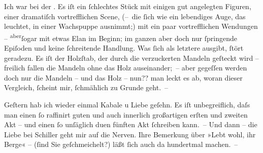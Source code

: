 \pstart
           Ich war bei der \label{K_L00392-2v}\label{K_L00392-2}. Es iſt ein{ }ſchlechtes Stück mit einigen gut
               angelegten Figuren, einer dramatiſch {\pb}vortrefflichen
               Scene, (– die \introOben{}ſich\introOben{} wie ein lebendiges Auge, das leuchtet,
                   in einer Wachspuppe ausnimmt;) mit ein
               paar vortrefflichen Wendungen – \substVorne{}\textsuperscript{aber}\substDazwischen{}ſogar\substHinten{} mit etwas Elan im Beginn; im ganzen aber doch nur{ }ſpringende Epiſoden und
               keine{ }ſchreitende Handlung. Was{ }ſich als letztere ausgibt,{ }ſtört geradezu. Es iſt der
               Holzſtab, der durch die verzuckerten Mandeln geſteckt wird – freilich fallen die
               Mandeln ohne das Holz auseinander; – aber gegeſſen werden doch nur die Mandeln – und
               das Holz – nun?? man leckt es ab, woran dieser Vergleich,{ }ſcheint mir, {\pb}ſchmählich zu Grunde geht. –\pend
           
\pstart
           Geſtern hab ich wieder einmal Kabale u Liebe
               geſehn. Es iſt unbegreiflich, daſs man einen{ }ſo raffinirt guten und auch innerlich
               großartigen erſten und zweiten Akt – und einen{ }ſo unſäglich du{\geminationm}en fünften Akt{ }ſchreiben kann. – Und dann – die Liebe
               bei Schiller geht mir auf die Nerven. Ihre
               Bemerkung über »Lebt wohl, ihr Berge« – (ſind Sie geſchmeichelt?) läßt{ }ſich auch da
               hundertmal machen. –\pend
           
